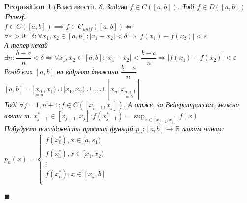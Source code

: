 \documentclass[a4paper, 14pt]{extarticle}
\def\huge{\displaystyle}
\theoremstyle{theoremdd}
\theoremstyle{theoremdd}
\theoremstyle{theoremdd}
\theoremstyle{theoremdd}
\theoremstyle{theoremdd}
\newtheorem{proposition}[theorem]{Proposition}
\theoremstyle{theoremdd}
\theoremstyle{theoremdd}
\theoremstyle{theoremdd}
\newenvironment{pfNoTh}{\textbf{Proof. \\}}{$\blacksquare$}
\begin{document}
\begin{proposition}[Властивості]
6. Задана $f \in C([a,b])$. Тоді $f \in D([a,b])$\\
\begin{pfNoTh}
$f \in C([a,b]) \implies f \in C_{unif}([a,b]) \iff$\\
$\forall \varepsilon > 0: \exists \delta: \forall x_1,x_2 \in [a,b]: |x_1-x_2| < \delta \Rightarrow |f(x_1)-f(x_2)| < \varepsilon$\\
А тепер нехай $\exists n: \dfrac{b-a}{n} < \delta \Rightarrow \forall x_1,x_2 \in [a,b]: |x_1 - x_2| < \dfrac{b-a}{n} \Rightarrow |f(x_1)-f(x_2)| < \varepsilon$\\
Розіб'ємо $[a,b]$ на відрізки довжини $\dfrac{b-a}{n}$\\
$[a,b] = [\underset{=a}{x_0}, x_1) \cup [x_1, x_2) \cup \dots \cup [x_n, \underset{=b}{x_{n+1}}]$\\
Тоді $\forall j = \overline{1,n+1}: f \in C([x_{j-1}, x_j])$. А отже, за Вейєрштрассом, можна взяти т. $x_{j-1}^* \in [x_{j-1}, x_j]: f(x_{j-1}^*) = \huge \sup_{x \in [x_{j-1}, x_j]} f(x)$\\
Побудуємо послідовність простих функцій $p_n: [a,b] \to \mathbb{R}$ таким чином:\\
$p_n(x) = \begin{cases} 
f(x_0^*), x \in [a, x_1) \\
f(x_1^*), x \in [x_1, x_2) \\
\vdots \\
f(x_n^*), x \in [x_n, b] \\
\end{cases}$
\begin{figure}[H]
\centering
{}
\end{figure}
\end{pfNoTh}
\end{proposition}
\end{document}

